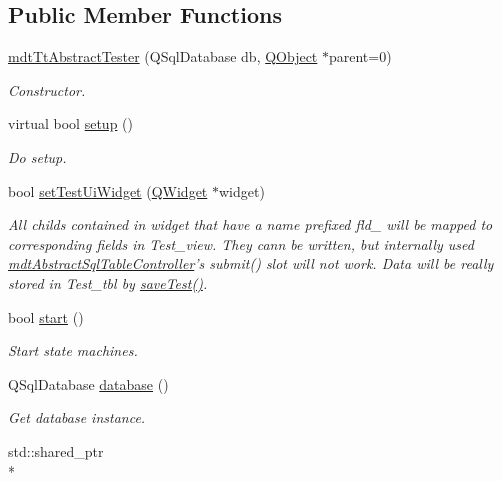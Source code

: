 \subsection*{Public Member Functions}
\begin{DoxyCompactItemize}
\item 
\hyperlink{classmdt_tt_abstract_tester_a8585d02e83ba1512b59d5e3984540b0a}{mdt\-Tt\-Abstract\-Tester} (Q\-Sql\-Database db, \hyperlink{class_q_object}{Q\-Object} $\ast$parent=0)
\begin{DoxyCompactList}\small\item\em Constructor. \end{DoxyCompactList}\item 
virtual bool \hyperlink{classmdt_tt_abstract_tester_a08e423ef173c8f925b351110637c8050}{setup} ()
\begin{DoxyCompactList}\small\item\em Do setup. \end{DoxyCompactList}\item 
bool \hyperlink{classmdt_tt_abstract_tester_a9cc3f5bfe9e27ac0ae376ea1c82e8585}{set\-Test\-Ui\-Widget} (\hyperlink{class_q_widget}{Q\-Widget} $\ast$widget)
\begin{DoxyCompactList}\small\item\em All childs contained in widget that have a name prefixed fld\-\_\- will be mapped to corresponding fields in Test\-\_\-view. They cann be written, but internally used \hyperlink{classmdt_abstract_sql_table_controller}{mdt\-Abstract\-Sql\-Table\-Controller}'s submit() slot will not work. Data will be really stored in Test\-\_\-tbl by \hyperlink{classmdt_tt_abstract_tester_a36fe4f0ba9940455a975538f89660327}{save\-Test()}. \end{DoxyCompactList}\item 
bool \hyperlink{classmdt_tt_abstract_tester_ab1095b5fc987c9d52de66b6c02ec7785}{start} ()
\begin{DoxyCompactList}\small\item\em Start state machines. \end{DoxyCompactList}\item 
Q\-Sql\-Database \hyperlink{classmdt_tt_abstract_tester_a43687d08109c032bc83ed287e8fdecc4}{database} ()
\begin{DoxyCompactList}\small\item\em Get database instance. \end{DoxyCompactList}\item 
std\-::shared\-\_\-ptr\\*

\end{DoxyCompactItemize}
